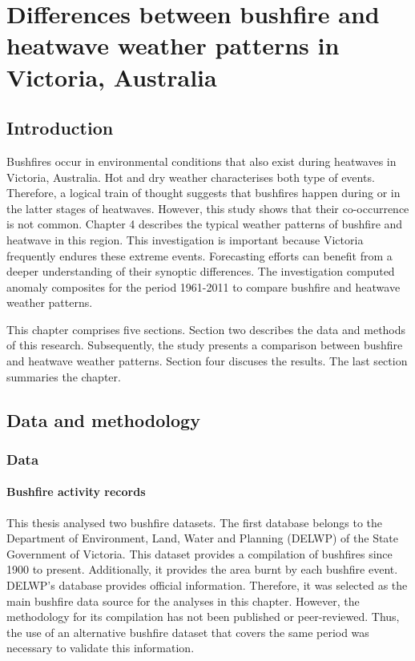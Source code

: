 
\chapter{Differences between bushfire and heatwave weather patterns in Victoria, Australia}
\newpage{}

\section{Introduction}

Bushfires occur in environmental conditions that also exist during
heatwaves in Victoria, Australia. Hot and dry weather characterises
both type of events. Therefore, a logical train of thought suggests
that bushfires happen during or in the latter stages of heatwaves.
However, this study shows that their co-occurrence is not common.
Chapter 4 describes the typical weather patterns of bushfire and heatwave
in this region. This investigation is important because Victoria frequently
endures these extreme events. Forecasting efforts can benefit from
a deeper understanding of their synoptic differences. The investigation
computed anomaly composites for the period 1961-2011 to compare bushfire
and heatwave weather patterns.

This chapter comprises five sections. Section two describes the data
and methods of this research. Subsequently, the study presents a comparison
between bushfire and heatwave weather patterns. Section four discuses
the results. The last section summaries the chapter.


\section{Data and methodology\label{sec:Data-and-methodology}}


\subsection{Data}


\subsubsection{Bushfire activity records}

This thesis analysed two bushfire datasets. The first database belongs
to the Department of Environment, Land, Water and Planning (DELWP)
of the State Government of Victoria. This dataset provides a compilation
of bushfires since 1900 to present. Additionally, it provides the
area burnt by each bushfire event. DELWP's database provides official
information. Therefore, it was selected as the main bushfire data
source for the analyses in this chapter. However, the methodology
for its compilation has not been published or peer-reviewed. Thus,
the use of an alternative bushfire dataset that covers the same period
was necessary to validate this information.

